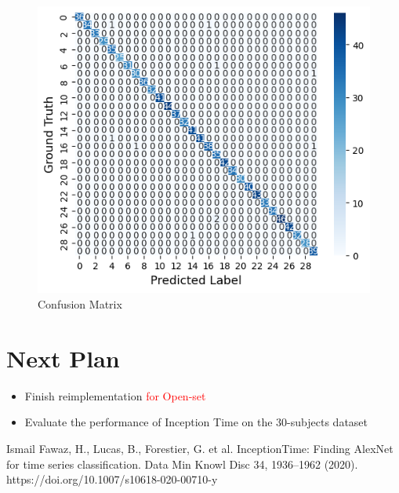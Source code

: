 \documentclass[dvipdfmx]{article}
\begin{document}
\begin{figure}[H]
\begin{center}
\includegraphics[width=0.8\linewidth]{./img/confu_matrix.png}
\end{center}
\caption{Confusion Matrix}
\end{figure}

\section{Next Plan}
\begin{itemize}
    \item Finish reimplementation \textcolor{red}{for Open-set}
    \item Evaluate the performance of Inception Time on the 30-subjects dataset 
\end{itemize}

\begin{thebibliography}{99}
 Ismail Fawaz, H., Lucas, B., Forestier, G. et al. InceptionTime: Finding AlexNet for time series classification. Data Min Knowl Disc 34, 1936–1962 (2020). https://doi.org/10.1007/s10618-020-00710-y
\end{thebibliography}
\end{document}

